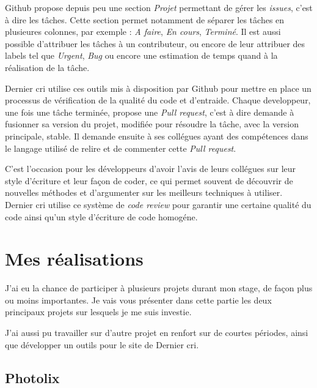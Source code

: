 \documentclass[12pt,a4paper]{article}
\begin{document}
  \bigskip

  Github propose depuis peu une section \emph{Projet} permettant de gérer
  les \emph{issues}, c'est à dire les tâches. Cette section permet
  notamment de séparer les tâches en plusieures colonnes, par exemple :
  \emph{A faire}, \emph{En cours}, \emph{Terminé}. Il est aussi possible
  d'attribuer les tâches à un contributeur, ou encore de leur attribuer
  des labels tel que \emph{Urgent}, \emph{Bug} ou encore une estimation de
  temps quand à la réalisation de la tâche.

  \bigskip

  Dernier cri utilise ces outils mis à disposition par Github pour mettre
  en place un processus de vérification de la qualité du code et
  d'entraide. Chaque developpeur, une fois une tâche terminée, propose une
  \emph{Pull request}, c'est à dire demande à fusionner sa version du
  projet, modifiée pour résoudre la tâche, avec la version principale,
  stable. Il demande ensuite à ses collégues ayant des compétences dans le
  langage utilisé de relire et de commenter cette \emph{Pull request}.

  \bigskip

  C'est l'occasion pour les développeurs d'avoir l'avis de leurs collégues
  sur leur style d'écriture et leur façon de coder, ce qui permet souvent
  de découvrir de nouvelles méthodes et d'argumenter sur les meilleurs
  techniques à utiliser. Dernier cri utilise ce système de \emph{code
  review} pour garantir une certaine qualité du code ainsi qu'un style
  d'écriture de code homogéne.

  \bigskip

  \section{Mes réalisations}\label{mes-ruxe9alisations}

  \bigskip

  J'ai eu la chance de participer à plusieurs projets durant mon stage, de
  façon plus ou moins importantes. Je vais vous présenter dans cette
  partie les deux principaux projets sur lesquels je me suis investie.

  \bigskip

  J'ai aussi pu travailler sur d'autre projet en renfort sur de courtes
  périodes, ainsi que développer un outils pour le site de Dernier cri.

  \bigskip

  \subsection{Photolix}\label{photolix}
\end{document}

